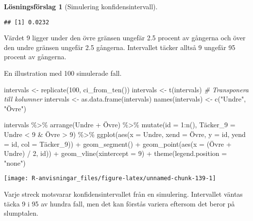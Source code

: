 \documentclass[
]{book}
\newenvironment{Shaded}{\begin{snugshade}}{\end{snugshade}}
\newcommand{\AttributeTok}[1]{\textcolor[rgb]{0.77,0.63,0.00}{#1}}
\newcommand{\CommentTok}[1]{\textcolor[rgb]{0.56,0.35,0.01}{\textit{#1}}}
\newcommand{\DecValTok}[1]{\textcolor[rgb]{0.00,0.00,0.81}{#1}}
\newcommand{\FunctionTok}[1]{\textcolor[rgb]{0.00,0.00,0.00}{#1}}
\newcommand{\NormalTok}[1]{#1}
\newcommand{\OtherTok}[1]{\textcolor[rgb]{0.56,0.35,0.01}{#1}}
\newcommand{\SpecialCharTok}[1]{\textcolor[rgb]{0.00,0.00,0.00}{#1}}
\newcommand{\StringTok}[1]{\textcolor[rgb]{0.31,0.60,0.02}{#1}}
\theoremstyle{definition}
\theoremstyle{definition}
\theoremstyle{definition}
\theoremstyle{definition}
\newtheorem{hypothesis}{Lösningsförslag}[chapter]
\theoremstyle{remark}
\begin{document}
\begin{hypothesis}[Simulering konfidensintervall]
\begin{verbatim}
## [1] 0.0232
\end{verbatim}

Värdet 9 ligger under den övre gränsen ungefär 2.5 procent av gångerna och över den undre gränsen ungefär 2.5 gångerna. Intervallet täcker alltså 9 ungefär 95 procent av gångerna.

En illustration med 100 simulerade fall.

\begin{Shaded}
\begin{Highlighting}[]
\NormalTok{intervals }\OtherTok{\textless{}{-}} \FunctionTok{replicate}\NormalTok{(}\DecValTok{100}\NormalTok{, }\FunctionTok{ci\_from\_ten}\NormalTok{())}
\NormalTok{intervals }\OtherTok{\textless{}{-}} \FunctionTok{t}\NormalTok{(intervals) }\CommentTok{\# Transponera till kolumner}
\NormalTok{intervals }\OtherTok{\textless{}{-}} \FunctionTok{as.data.frame}\NormalTok{(intervals)}
\FunctionTok{names}\NormalTok{(intervals) }\OtherTok{\textless{}{-}} \FunctionTok{c}\NormalTok{(}\StringTok{"Undre"}\NormalTok{, }\StringTok{"Övre"}\NormalTok{)}

\NormalTok{intervals }\SpecialCharTok{\%\textgreater{}\%} 
  \FunctionTok{arrange}\NormalTok{(Undre }\SpecialCharTok{+}\NormalTok{ Övre) }\SpecialCharTok{\%\textgreater{}\%} 
  \FunctionTok{mutate}\NormalTok{(}\AttributeTok{id =} \DecValTok{1}\SpecialCharTok{:}\FunctionTok{n}\NormalTok{(),}
\NormalTok{         Täcker}\AttributeTok{\_9 =}\NormalTok{ Undre }\SpecialCharTok{\textless{}} \DecValTok{9} \SpecialCharTok{\&}\NormalTok{ Övre }\SpecialCharTok{\textgreater{}} \DecValTok{9}\NormalTok{) }\SpecialCharTok{\%\textgreater{}\%} 
  \FunctionTok{ggplot}\NormalTok{(}\FunctionTok{aes}\NormalTok{(}\AttributeTok{x =}\NormalTok{ Undre, }\AttributeTok{xend =}\NormalTok{ Övre, }\AttributeTok{y =}\NormalTok{ id, }\AttributeTok{yend =}\NormalTok{ id, }\AttributeTok{col =}\NormalTok{ Täcker\_9)) }\SpecialCharTok{+}
  \FunctionTok{geom\_segment}\NormalTok{() }\SpecialCharTok{+}
  \FunctionTok{geom\_point}\NormalTok{(}\FunctionTok{aes}\NormalTok{(}\AttributeTok{x =}\NormalTok{ (Övre }\SpecialCharTok{+}\NormalTok{ Undre) }\SpecialCharTok{/} \DecValTok{2}\NormalTok{, id)) }\SpecialCharTok{+}
  \FunctionTok{geom\_vline}\NormalTok{(}\AttributeTok{xintercept =} \DecValTok{9}\NormalTok{) }\SpecialCharTok{+}
  \FunctionTok{theme}\NormalTok{(}\AttributeTok{legend.position =} \StringTok{"none"}\NormalTok{)}
\end{Highlighting}
\end{Shaded}

\begin{center}\texttt{[image: R-anvisningar\_files/figure-latex/unnamed-chunk-139-1]} \end{center}

Varje streck motsvarar konfidensintervallet från en simulering. Intervallet väntas täcka 9 i 95 av hundra fall, men det kan förstås variera eftersom det beror på slumptalen.
\end{hypothesis}
\end{document}
